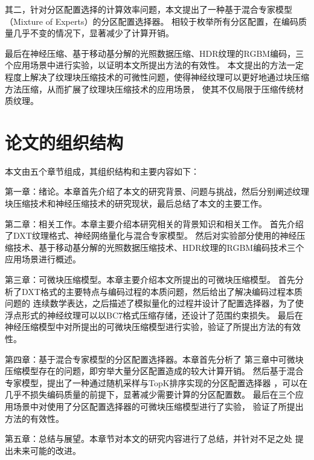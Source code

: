 其二，针对分区配置选择的计算效率问题，本文提出了一种基于混合专家模型（Mixture of Experts）的分区配置选择器。
相较于枚举所有分区配置，在编码质量几乎不变的情况下，显著减少了计算开销。

最后在神经压缩\cite{weinreich2024real}、基于移动基分解的光照数据压缩\cite{silvennoinen2021moving}、HDR纹理的RGBM编码，三个应用场景中进行实验，以证明本文所提出方法的有效性。
本文提出的方法一定程度上解决了纹理块压缩技术的可微性问题，使得神经纹理可以更好地通过块压缩方法压缩，从而扩展了纹理块压缩技术的应用场景，
使其不仅局限于压缩传统材质纹理。

\section{论文的组织结构}

本文由五个章节组成，其组织结构和主要内容如下：

第一章：绪论。本章首先介绍了本文的研究背景、问题与挑战，然后分别阐述纹理
块压缩技术和神经压缩技术的研究现状，最后总结了本文的主要工作。

第二章：相关工作。本章主要介绍本研究相关的背景知识和相关工作。
首先介绍了DXT纹理格式、神经网络量化与混合专家模型。
然后对实验部分使用的神经压缩技术、基于移动基分解的光照数据压缩技术、HDR纹理的RGBM编码技术三个应用场景进行概述。

第三章：可微块压缩模型。本章主要介绍本文所提出的可微块压缩模型。
首先分析了DXT格式的主要特点与编码过程的本质问题，然后给出了解决编码过程本质问题的
连续数学表达，之后描述了模拟量化的过程并设计了配置选择器，为了使
浮点形式的神经纹理可以以BC7格式压缩存储，还设计了范围约束损失。
最后在神经压缩模型中对所提出的可微块压缩模型进行实验，验证了所提出方法的有效性。

第四章：基于混合专家模型的分区配置选择器。本章首先分析了
第三章中可微块压缩模型存在的问题，即穷举大量分区配置造成的较大计算开销。
然后基于混合专家模型，提出了一种通过随机采样与TopK排序实现的分区配置选择器
，可以在几乎不损失编码质量的前提下，显著减少需要计算的分区配置数。
最后在三个应用场景中对使用了分区配置选择器的可微块压缩模型进行了实验，
验证了所提出方法的有效性。

第五章：总结与展望。本章节对本文的研究内容进行了总结，并针对不足之处
提出未来可能的改进。

